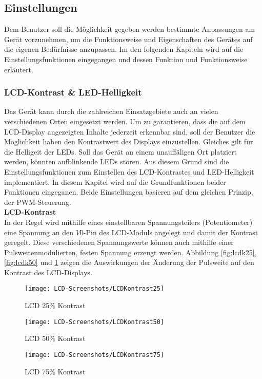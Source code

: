 \subsection{Einstellungen}
Dem Benutzer soll die Möglichkeit gegeben werden bestimmte Anpassungen am Gerät vorzunehmen, um die Funktionsweise und Eigenschaften des Gerätes auf die eigenen Bedürfnisse anzupassen. Im den folgenden Kapiteln wird auf die Einstellungsfunktionen eingegangen und dessen Funktion und Funktionsweise erläutert.
\subsubsection{LCD-Kontrast \& LED-Helligkeit}
Das Gerät kann durch die zahlreichen Einsatzgebiete auch an vielen verschiedenen Orten eingesetzt werden. Um zu garantieren, dass die auf dem LCD-Display angezeigten Inhalte jederzeit erkennbar sind, soll der Benutzer die Möglichkeit haben den Kontrastwert des Displays einzustellen. Gleiches gilt für die Helligeit der LEDs. Soll das Gerät an einem unauffäligen Ort platziert werden, könnten aufblinkende LEDs stören. Aus diesem Grund sind die Einstellungsfunktionen zum Einstellen des LCD-Kontrastes und LED-Helligkeit implementiert. In diesem Kapitel wird auf die Grundfunktionen beider Funktionen eingeganen. Beide Einstellungen basieren auf dem gleichen Prinzip, der PWM-Steuerung. \\
\newline
\textbf{LCD-Kontrast}\\
In der Regel wird mithilfe eines einstellbaren Spannungsteilers (Potentiometer) eine Spannung an den $V0$-Pin des LCD-Moduls angelegt und damit der Kontrast geregelt. Diese verschiedenen Spannungswerte können auch mithilfe einer Pulsweitenmodulierten, festen Spannung erzeugt werden. Abbildung \ref{fig:lcdk25}, \ref{fig:lcdk50} und \ref{fig:lcdk75} zeigen die Auswirkungen der Änderung der Pulsweite auf den Kontrast des LCD-Displays. 
\begin{figure}[h]
	\begin{minipage}{.3\linewidth}
		\centering
		\texttt{[image: LCD-Screenshots/LCDKontrast25]}
		\caption{LCD 25\% Kontrast}
		\label{fig:lcdk25}
	\end{minipage}
	\hfill
	\begin{minipage}{.3\linewidth}
		\centering
		\texttt{[image: LCD-Screenshots/LCDKontrast50]}
		\caption{LCD 50\% Kontrast}
		\label{fig:lcdk50}
	\end{minipage}
	\hfill
	\begin{minipage}{.3\linewidth}
		\centering
		\texttt{[image: LCD-Screenshots/LCDKontrast75]}
		\caption{LCD 75\% Kontrast}
		\label{fig:lcdk75}
	\end{minipage}
	\hfill
\end{figure}
